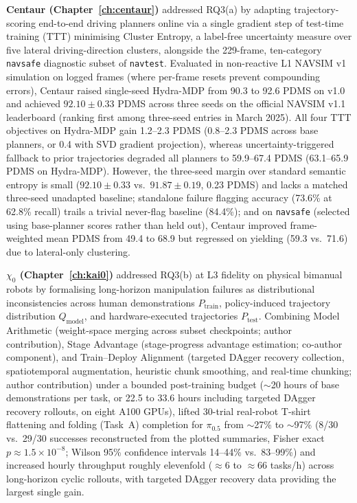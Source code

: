 \textbf{Centaur (Chapter~\ref{ch:centaur})} addressed RQ3(a) by adapting trajectory-scoring end-to-end driving planners online via a single gradient step of test-time training (TTT) minimising Cluster Entropy, a label-free uncertainty measure over five lateral driving-direction clusters, alongside the 229-frame, ten-category \texttt{navsafe} diagnostic subset of \texttt{navtest}. Evaluated in non-reactive L1 NAVSIM v1 simulation on logged frames (where per-frame resets prevent compounding errors), Centaur raised single-seed Hydra-MDP from 90.3 to 92.6 PDMS on v1.0 and achieved $92.10 \pm 0.33$ PDMS across three seeds on the official NAVSIM v1.1 leaderboard (ranking first among three-seed entries in March 2025). All four TTT objectives on Hydra-MDP gain 1.2--2.3 PDMS (0.8--2.3 PDMS across base planners, or 0.4 with SVD gradient projection), whereas uncertainty-triggered fallback to prior trajectories degraded all planners to 59.9--67.4 PDMS (63.1--65.9 PDMS on Hydra-MDP). However, the three-seed margin over standard semantic entropy is small ($92.10 \pm 0.33$ vs.\ $91.87 \pm 0.19$, 0.23 PDMS) and lacks a matched three-seed unadapted baseline; standalone failure flagging accuracy (73.6\% at 62.8\% recall) trails a trivial never-flag baseline (84.4\%); and on \texttt{navsafe} (selected using base-planner scores rather than held out), Centaur improved frame-weighted mean PDMS from 49.4 to 68.9 but regressed on yielding (59.3 vs.\ 71.6) due to lateral-only clustering.

\textbf{$\chi_0$ (Chapter~\ref{ch:kai0})} addressed RQ3(b) at L3 fidelity on physical bimanual robots by formalising long-horizon manipulation failures as distributional inconsistencies across human demonstrations $P_{\mathrm{train}}$, policy-induced trajectory distribution $Q_{\mathrm{model}}$, and hardware-executed trajectories $P_{\mathrm{test}}$. Combining Model Arithmetic (weight-space merging across subset checkpoints; author contribution), Stage Advantage (stage-progress advantage estimation; co-author component), and Train--Deploy Alignment (targeted DAgger recovery collection, spatiotemporal augmentation, heuristic chunk smoothing, and real-time chunking; author contribution) under a bounded post-training budget ($\sim$20 hours of base demonstrations per task, or 22.5 to 33.6 hours including targeted DAgger recovery rollouts, on eight A100 GPUs), \chiz lifted 30-trial real-robot T-shirt flattening and folding (Task~A) completion for $\pi_{0.5}$ from $\sim$27\% to $\sim$97\% (8/30 vs.\ 29/30 successes reconstructed from the plotted summaries, Fisher exact $p \approx 1.5 \times 10^{-8}$; Wilson 95\% confidence intervals 14--44\% vs.\ 83--99\%) and increased hourly throughput roughly elevenfold ($\approx 6$ to $\approx 66$ tasks/h) across long-horizon cyclic rollouts, with targeted DAgger recovery data providing the largest single gain.

